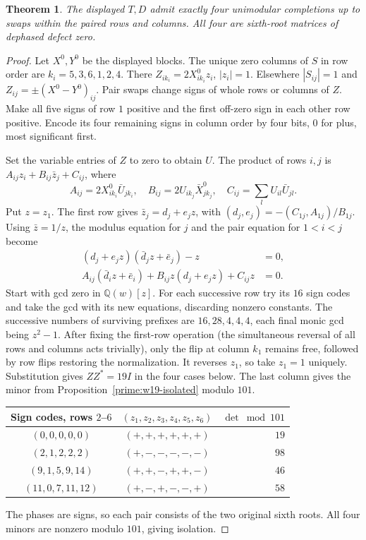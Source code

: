 \documentclass[11pt,a4paper]{article}
\newtheorem{theorem}{Theorem}[section]
\numberwithin{equation}{section}
\begin{document}
\begin{theorem}\label{prime:w19-completions}
The displayed $T,D$ admit exactly four unimodular completions up to swaps within the paired rows and columns. All four are sixth-root matrices of dephased defect zero.
\end{theorem}
\begin{proof}
Let $X^0,Y^0$ be the displayed blocks. The unique zero columns of $S$ in row order are $k_i=5,3,6,1,2,4$. There $Z_{ik_i}=2X^0_{ik_i}z_i$, $|z_i|=1$. Elsewhere $|S_{ij}|=1$ and $Z_{ij}=\pm(X^0-Y^0)_{ij}$. Pair swaps change signs of whole rows or columns of $Z$. Make all five signs of row $1$ positive and the first off-zero sign in each other row positive. Encode its four remaining signs in column order by four bits, $0$ for plus, most significant first.

Set the variable entries of $Z$ to zero to obtain $U$. The product of rows $i,j$ is $A_{ij}z_i+B_{ij}\bar z_j+C_{ij}$, where
$$A_{ij}=2X^0_{ik_i}\bar U_{jk_i},\quad B_{ij}=2U_{ik_j}\bar X^0_{jk_j},\quad C_{ij}=\sum_l U_{il}\bar U_{jl}.$$
Put $z=z_1$. The first row gives $\bar z_j=d_j+e_jz$, with $(d_j,e_j)=-(C_{1j},A_{1j})/B_{1j}$. Using $\bar z=1/z$, the modulus equation for $j$ and the pair equation for $1<i<j$ become
\begin{align*}
 (d_j+e_jz)(\bar d_jz+\bar e_j)-z&=0,\\
 A_{ij}(\bar d_i z+\bar e_i)+B_{ij}z(d_j+e_jz)+C_{ij}z&=0.
\end{align*}
Start with gcd zero in $\mathbb Q(w)[z]$. For each successive row try its $16$ sign codes and take the gcd with its new equations, discarding nonzero constants. The successive numbers of surviving prefixes are $16,28,4,4,4$, each final monic gcd being $z^2-1$. After fixing the first-row operation (the simultaneous reversal of all rows and columns acts trivially), only the flip at column $k_1$ remains free, followed by row flips restoring the normalization. It reverses $z_1$, so take $z_1=1$ uniquely. Substitution gives $ZZ^*=19I$ in the four cases below. The last column gives the minor from Proposition~\ref{prime:w19-isolated} modulo $101$.
\begin{center}
\begin{tabular}{c@{\qquad}c@{\qquad}r}
\toprule
Sign codes, rows $2$--$6$ & $(z_1,z_2,z_3,z_4,z_5,z_6)$ & $\det\bmod101$\\ \midrule
$(0,0,0,0,0)$ & $(+,+,+,+,+,+)$ & $19$\\
$(2,1,2,2,2)$ & $(+,-,-,-,-,-)$ & $98$\\
$(9,1,5,9,14)$ & $(+,+,-,+,+,-)$ & $46$\\
$(11,0,7,11,12)$ & $(+,-,+,-,-,+)$ & $58$\\ \bottomrule
\end{tabular}
\end{center}
The phases are signs, so each pair consists of the two original sixth roots. All four minors are nonzero modulo $101$, giving isolation.
\end{proof}
\end{document}
